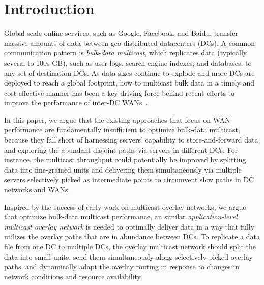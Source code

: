 \section{Introduction}

Global-scale online services, such as Google, Facebook, and 
Baidu, transfer massive amounts of data between geo-distributed 
datacenters (DCs). 
A common communication pattern is {\em bulk-data multicast}, 
which replicates data 
(typically several to 100s GB), such as user 
logs, search engine indexes, and databases, 
to any set of destination DCs. 
As data sizes continue to explode and more DCs are deployed to 
reach a global footprint, how to multicast bulk data in a timely 
and cost-effective manner has been a key driving force behind 
recent efforts to improve the performance of inter-DC 
WANs~\cite{b4,bwe,swan,??,??,??}.



In this paper, we argue that the existing approaches that focus 
on WAN performance are fundamentally insufficient to optimize 
bulk-data multicast, because they fall 
short of harnessing servers' capability to store-and-forward 
data, and exploring the abundant disjoint paths via servers 
in different DCs. 
For instance, the multicast throughput could potentially be 
improved by splitting data into fine-grained units and 
delivering them simultaneously via multiple servers selectively 
picked as intermediate points to circumvent slow paths in DC
networks and WANs.


Inspired by the success of early work on multicast overlay 
networks, we argue that optimize bulk-data multicast performance,
an similar {\em application-level multicast overlay network} 
is needed to optimally deliver data in
a way that fully utilizes the overlay paths that are in abundance 
between DCs.
To replicate a data file from one DC to multiple DCs, 
the overlay multicast network should split the data into small 
units, send them simultaneously along selectively picked overlay 
paths, and dynamically adapt the overlay routing in response to 
changes in network conditions and 
resource availability.


